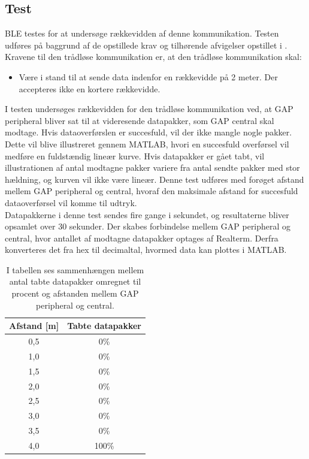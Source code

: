 \subsection{Test}
BLE testes for at undersøge rækkevidden af denne kommunikation. Testen udføres på baggrund af de opstillede krav og tilhørende afvigelser opstillet i . Kravene til den trådløse kommunikation er, at den trådløse kommunikation skal:
\begin{itemize}
	\item Være i stand til at sende data indenfor en rækkevidde på 2 meter. Der accepteres ikke en kortere rækkevidde.
\end{itemize}
I testen undersøges rækkevidden for den trådløse kommunikation ved, at GAP peripheral bliver sat til at videresende datapakker, som GAP central skal modtage. Hvis dataoverførslen er succesfuld, vil der ikke mangle nogle pakker. Dette vil blive illustreret gennem MATLAB, hvori en succesfuld overførsel vil medføre en fuldstændig lineær kurve. Hvis datapakker er gået tabt, vil illustrationen af antal modtagne pakker variere fra antal sendte pakker med stor hældning, og kurven vil ikke være lineær. Denne test udføres med forøget afstand mellem GAP peripheral og central, hvoraf den maksimale afstand for succesfuld dataoverførsel vil komme til udtryk. \\
Datapakkerne i denne test sendes fire gange i sekundet, og resultaterne bliver opsamlet over 30 sekunder. Der skabes forbindelse mellem GAP peripheral og central, hvor antallet af modtagne datapakker optages af Realterm. Derfra konverteres det fra hex til decimaltal, hvormed data kan plottes i MATLAB.
\begin{table}[H]
	\centering
	\begin{tabular}{cc}
			\hline
		\rowcolor[HTML]{C0C0C0} 
		Afstand {[}m{]} & Tabte datapakker \\ 	\hline
		0,5 	& 0\% \\ 	\hline
		1,0		& 0\% \\	\hline
		1,5 	& 0\% \\	\hline
		2,0		& 0\% \\	\hline
		2,5 	& 0\% \\	\hline
		3,0		& 0\% \\	\hline
		3,5 	& 0\% \\	\hline
		4,0		& 100\% \\	\hline
	\end{tabular}
	\caption{I tabellen ses sammenhængen mellem antal tabte datapakker omregnet til procent og afstanden mellem GAP peripheral og central.}
	\label{test:ble_overforsel}
\end{table}\vspace{-.25cm}
